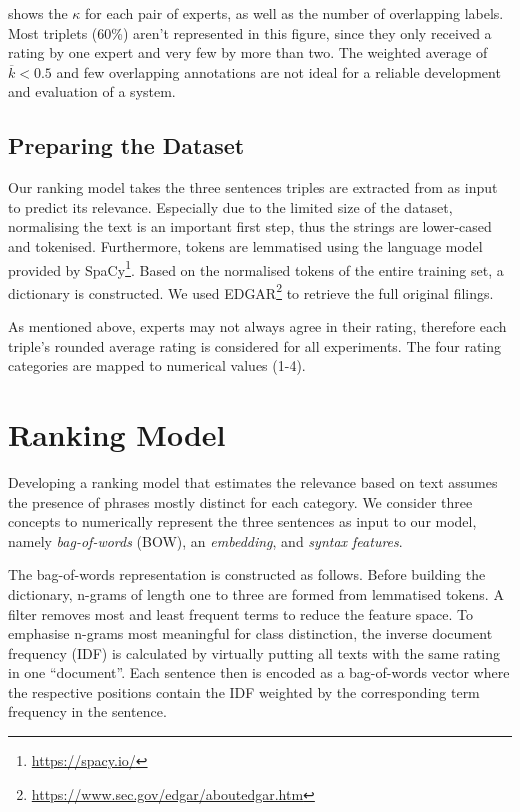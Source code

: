  shows the $\kappa$ for each pair of experts, as well as the number of overlapping labels. Most triplets (60\%) aren't represented in this figure, since they only received a rating by one expert and very few by more than two. The weighted average of $\overline{k}<0.5$ and few overlapping annotations are not ideal for a reliable development and evaluation of a system.

\subsection{Preparing the Dataset}
Our ranking model takes the three sentences triples are extracted from as input to predict its relevance.
Especially due to the limited size of the dataset, normalising the text is an important first step, thus the strings are lower-cased and tokenised. 
Furthermore, tokens are lemmatised using the language model provided by SpaCy\footnote{\url{https://spacy.io/}}.
Based on the normalised tokens of the entire training set, a dictionary is constructed.
We used EDGAR\footnote{\url{https://www.sec.gov/edgar/aboutedgar.htm}} to retrieve the full original filings.

As mentioned above, experts may not always agree in their rating, therefore each triple's rounded average rating is considered for all experiments.
The four rating categories are mapped to numerical values (1-4).

\section{Ranking Model}
Developing a ranking model that estimates the relevance based on text assumes the presence of phrases mostly distinct for each category.
We consider three concepts to numerically represent the three sentences as input to our model, namely \textit{bag-of-words} (BOW), an \textit{embedding}, and \textit{syntax features}.

The bag-of-words representation is constructed as follows. 
Before building the dictionary, n-grams of length one to three are formed from lemmatised tokens. 
A filter removes most and least frequent terms to reduce the feature space. To emphasise n-grams most meaningful for class distinction, the inverse document frequency (IDF) is calculated by virtually putting all texts with the same rating in one ``document''. 
Each sentence then is encoded as a bag-of-words vector where the respective positions contain the IDF weighted by the corresponding term frequency in the sentence.

